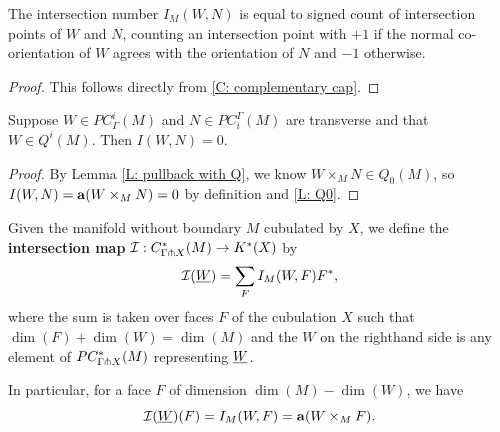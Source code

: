\begin{lemma}\label{L: intersection number}
The intersection number $I_M(W,N)$ is equal to signed count of intersection points of $W$ and $N$, counting an intersection point with $+1$ if the normal co-orientation of $W$ agrees with the orientation of $N$ and $-1$ otherwise.
\end{lemma}
\begin{proof}
This follows directly from \cref{C: complementary cap}.

\end{proof}

\begin{lemma}\label{L: Q-trivial intersection}
Suppose $W \in PC_\Gamma^i(M)$ and $N \in PC_{i}^\Gamma(M)$ are transverse and that $W \in Q^i(M)$. Then $I(W,N) = 0$.
\end{lemma}
\begin{proof}
By Lemma \ref{L: pullback with Q}, we know $W \times_M N \in Q_0(M)$, so $I(W,N) = \mathbf{a}(W \times_M N) = 0$ by definition and \cref{L: Q0}.
\end{proof}

\begin{definition}\label{D: intersection homomorphism}
Given the manifold without boundary $M$ cubulated by $X$, we define the \textbf{intersection map} $\mathcal{I}: C^*_{\Gamma\pitchfork X}(M) \to K^*(X)$ by $$\mathcal{I}(\underline{W}) = \sum_F I_M(W,F)F^*,$$ where the sum is taken over faces $F$ of the cubulation $X$ such that $\dim(F)+\dim(W) = \dim(M)$ and the $W$ on the righthand side is any element of $PC^*_{\Gamma\pitchfork X}(M)$ representing $\underline{W}$.

In particular, for a face $F$ of dimension $\dim(M)-\dim(W)$, we have $$\mathcal{I}(\underline{W})(F) = I_M(W,F) = \mathbf{a}(W \times_M F).$$
\end{definition}


